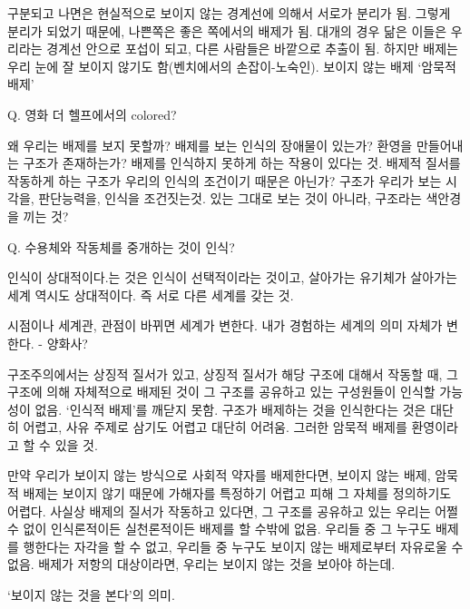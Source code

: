 \documentclass{article}
\begin{document}
구분되고 나면은 현실적으로 보이지 않는 경계선에 의해서 서로가 분리가 됨. 그렇게 분리가 되었기 때문에, 나쁜쪽은 좋은 쪽에서의 배제가 됨. 대개의 경우 닮은 이들은 우리라는 경계선 안으로 포섭이 되고, 다른 사람들은 바깥으로 추출이 됨. 하지만 배제는 우리 눈에 잘 보이지 않기도 함(벤치에서의 손잡이-노숙인). 보이지 않는 배제 `암묵적 배제' 

Q. 영화 더 헬프에서의 colored?

왜 우리는 배제를 보지 못할까? 배제를 보는 인식의 장애물이 있는가? 환영을 만들어내는 구조가 존재하는가? 배제를 인식하지 못하게 하는 작용이 있다는 것. 배제적 질서를 작동하게 하는 구조가 우리의 인식의 조건이기 때문은 아닌가? 구조가 우리가 보는 시각을, 판단능력을, 인식을 조건짓는것.
있는 그대로 보는 것이 아니라, 구조라는 색안경을 끼는 것?

Q. 수용체와 작동체를 중개하는 것이 인식? 

인식이 상대적이다.는 것은 인식이 선택적이라는 것이고, 살아가는 유기체가 살아가는 세계 역시도 상대적이다. 즉 서로 다른 세계를 갖는 것. 

시점이나 세계관, 관점이 바뀌면 세계가 변한다. 내가 경험하는 세계의 의미 자체가 변한다. - 양화사?

구조주의에서는 상징적 질서가 있고, 상징적 질서가 해당 구조에 대해서 작동할 때, 그 구조에 의해 자체적으로 배제된 것이 그 구조를 공유하고 있는 구성원들이 인식할 가능성이 없음. `인식적 배제'를 깨닫지 못함. 구조가 배제하는 것을 인식한다는 것은 대단히 어렵고, 사유 주제로 삼기도 어렵고 대단히 어려움. 그러한 암묵적 배제를 환영이라고 할 수 있을 것.

만약 우리가 보이지 않는 방식으로 사회적 약자를 배제한다면, 보이지 않는 배제, 암묵적 배제는 보이지 않기 때문에 가해자를 특정하기 어렵고 피해 그 자체를 정의하기도 어렵다. 사실상 배제의 질서가 작동하고 있다면, 그 구조를 공유하고 있는 우리는 어쩔 수 없이 인식론적이든 실천론적이든 배제를 할 수밖에 없음. 우리들 중 그 누구도 배제를 행한다는 자각을 할 수 없고, 우리들 중 누구도 보이지 않는 배제로부터 자유로울 수 없음. 배제가 저항의 대상이라면, 우리는 보이지 않는 것을 보아야 하는데. 

`보이지 않는 것을 본다'의 의미.
\end{document}
